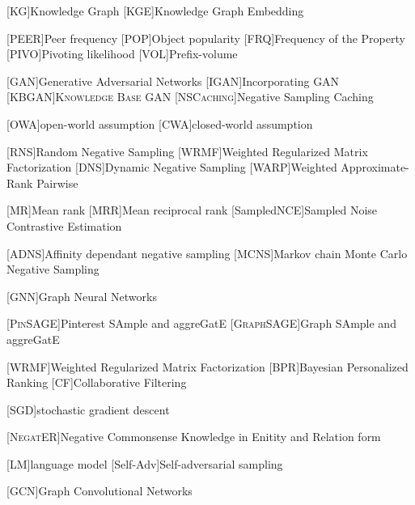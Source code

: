 \begin{acronym}[ECU]

[KG]{Knowledge Graph}
[KGE]{Knowledge Graph Embedding}

[PEER]{Peer frequency}
[POP]{Object popularity }
[FRQ]{Frequency of the Property}
[PIVO]{Pivoting likelihood}
[VOL]{Prefix-volume}

[GAN]{Generative Adversarial Networks}
[\textsc{IGAN}]{Incorporating GAN}
[\textsc{KBGAN}]{\textsc{Knowledge Base GAN}}
[\textsc{NSCaching}]{Negative Sampling Caching}

[OWA]{open-world assumption}
[CWA]{closed-world assumption}

[RNS]{Random Negative Sampling}
[WRMF]{Weighted Regularized Matrix Factorization}
[DNS]{Dynamic Negative Sampling}
[WARP]{Weighted Approximate-Rank Pairwise}

[MR]{Mean rank}
[MRR]{Mean reciprocal rank}
[SampledNCE]{Sampled Noise Contrastive Estimation}

[\textsc{ADNS}]{Affinity dependant negative sampling}
[\textsc{MCNS}]{Markov chain Monte Carlo Negative Sampling}
    
[GNN]{Graph Neural Networks}

[\textsc{PinSAGE}]{Pinterest SAmple and aggreGatE}
[\textsc{GraphSAGE}]{Graph SAmple and aggreGatE}


[WRMF]{Weighted Regularized Matrix Factorization}
[BPR]{Bayesian Personalized Ranking}
[CF]{Collaborative Filtering}

[SGD]{stochastic gradient descent}

[\textsc{NegatER}]{Negative Commonsense Knowledge in Enitity and Relation form}

[LM]{language model}
[Self-Adv]{Self-adversarial sampling}

[GCN]{Graph Convolutional Networks}




\end{acronym}